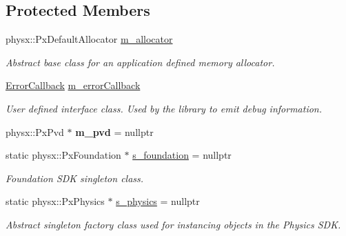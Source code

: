 \subsection*{Protected Members}
\begin{DoxyCompactItemize}
\item 
\mbox{\label{classrev_1_1_physics_manager_ad8c99d1f7ce1d7b5db312b8a6b4d0598}} 
physx\+::\+Px\+Default\+Allocator \mbox{\hyperlink{classrev_1_1_physics_manager_ad8c99d1f7ce1d7b5db312b8a6b4d0598}{m\+\_\+allocator}}
\begin{DoxyCompactList}\small\item\em Abstract base class for an application defined memory allocator. \end{DoxyCompactList}\item 
\mbox{\label{classrev_1_1_physics_manager_aac8be97053379298472743c40737e1ac}} 
\mbox{\hyperlink{classrev_1_1_error_callback}{Error\+Callback}} \mbox{\hyperlink{classrev_1_1_physics_manager_aac8be97053379298472743c40737e1ac}{m\+\_\+error\+Callback}}
\begin{DoxyCompactList}\small\item\em User defined interface class. Used by the library to emit debug information. \end{DoxyCompactList}\item 
\mbox{\label{classrev_1_1_physics_manager_afa84bdf0710ba69cf03225907ab8b5b3}} 
physx\+::\+Px\+Pvd $\ast$ {\bfseries m\+\_\+pvd} = nullptr
\item 
static physx\+::\+Px\+Foundation $\ast$ \mbox{\hyperlink{classrev_1_1_physics_manager_a88bf72ece5164ece7c4e3705e9eb2915}{s\+\_\+foundation}} = nullptr
\begin{DoxyCompactList}\small\item\em Foundation S\+DK singleton class. \end{DoxyCompactList}\item 
static physx\+::\+Px\+Physics $\ast$ \mbox{\hyperlink{classrev_1_1_physics_manager_abe949f3d62ca0783611f0c2a774f8a93}{s\+\_\+physics}} = nullptr
\begin{DoxyCompactList}\small\item\em Abstract singleton factory class used for instancing objects in the Physics S\+DK. \end{DoxyCompactList}\item 

\end{DoxyCompactItemize}
